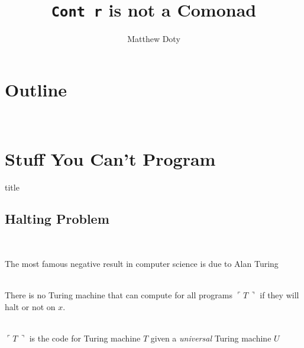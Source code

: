 \documentclass{beamer}
\title{\texttt{Cont r} is not a Comonad} \author{Matthew Doty} \date{}
\begin{document}
{ \frame{\titlepage}}


\hypersetup{colorlinks=false}

\section*{Outline}%

\hypersetup{colorlinks}

\begin{frame}[shrink=35]{\insertsectionhead}%
  \ \
  \tableofcontents %
\end{frame}

\section{Stuff You Can't Program}
\begin{frame}[plain]
  \vfill \centering
  \begin{beamercolorbox}[sep=8pt,center,shadow=true,rounded=true]{title}
    \usebeamerfont{title}\insertsectionhead\par%
  \end{beamercolorbox}
  \vfill
\end{frame}

\subsection{Halting Problem}
\begin{frame}[plain]{\insertsectionhead\ \textemdash\
    \insertsubsectionhead}

  The most famous negative result in computer science is due to Alan
  Turing \cite{turingComputableNumbersApplication1937}\\~\\

  \begin{proposition}
    There is no Turing machine that can compute for all programs
    $\ulcorner T\, \urcorner$ if they will halt or not on $x$.\\~\\
  \end{proposition}

  $\ulcorner T\, \urcorner$ is the code for Turing machine $T$
  given a \emph{universal} Turing machine $U$

\end{frame}
\end{document}
